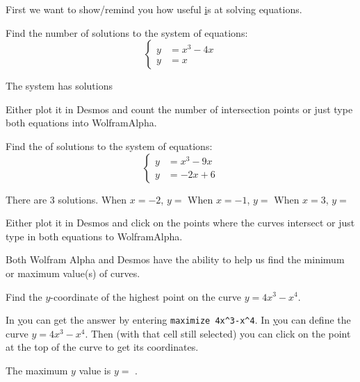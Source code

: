 \documentclass{ximera}
\begin{document}
First we want to show/remind you how useful \href{http://wolframalpha.com} is at solving equations.

\begin{question}
Find the number of solutions to the system of equations:
\[
\begin{cases}
y&=x^3-4x\\
y&=x
\end{cases}
\]

The system has  solutions
\begin{hint}
Either plot it in Desmos and count the number of intersection points or just type both equations into WolframAlpha.
\end{hint}

\end{question}



\begin{question}
Find the of solutions to the system of equations:
\[
\begin{cases}
y&=x^3-9x\\
y&=-2x+6
\end{cases}
\]

There are $3$ solutions. 
When $x=-2$, $y=$ 
When $x=-1$, $y=$ 
When $x=3$, $y=$ 

\begin{hint}
Either plot it in Desmos and click on the points where the curves intersect or just type in both equations to WolframAlpha.
\end{hint}

\end{question}

Both Wolfram Alpha and Desmos have the ability to help us find the minimum or maximum value(s) of curves. 

\begin{question}
Find the $y$-coordinate of the highest point on the curve $y=4x^3-x^4$. 

In \href{http://wolframalpha.com} you can  get the answer by entering \verb|maximize 4x^3-x^4|. In \href{http://desmos.com} you can define the curve $y=4x^3-x^4$. Then (with that cell still selected) you can click on the point at the top of the curve to get its coordinates.


The maximum $y$ value is $y=$ .

\end{question}
\end{document}
